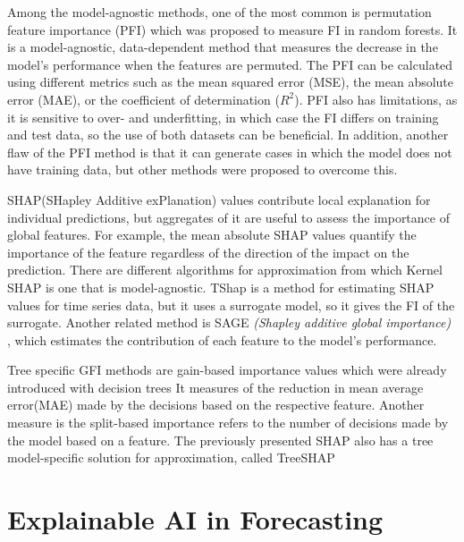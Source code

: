 Among the model-agnostic methods, one of the most common is permutation feature importance (PFI) which was proposed to measure FI in random forests\cite{Breiman2001}.
It is a model-agnostic, data-dependent method that measures the decrease in the model's performance when the features are permuted.
The PFI can be calculated using different metrics such as the mean squared error (MSE), the mean absolute error (MAE), or the coefficient of determination ($R^2$).
PFI also has limitations, as it is sensitive to over- and underfitting\cite{molnar2020limitations}, in which case the FI differs on training and test data, so the use of both datasets can be beneficial.
In addition, another flaw of the PFI method is that it can generate cases in which the model does not have training data\cite{Molnar_2020_pitfalls,giles_hooker_unrestricted_2021},
but other methods were proposed to overcome this\cite{ian_covert_understanding_2020, kristin_blesch_conditional_2023}.

SHAP(SHapley Additive exPlanation)\cite{scott_lundberg_unified_2017} values contribute local explanation for individual predictions, but aggregates of it are useful to assess the importance of global features.
For example, the mean absolute SHAP values quantify the importance of the feature regardless of the direction of the impact on the prediction.
There are different algorithms for approximation from which Kernel SHAP\cite{scott_lundberg_unified_2017} is one that is model-agnostic.
TShap \cite{vikas_c_raykar_tsshap_2023} is a method for estimating SHAP values for time series data, but it uses a surrogate model, so it gives the FI of the surrogate.
Another related method is SAGE \emph{(Shapley additive global importance)} \cite{ian_covert_understanding_2020}, which estimates the contribution of each feature to the model's performance.

Tree specific GFI methods are gain-based importance values which were already introduced with decision trees \cite{gordon_classification_1984}
It measures of the reduction in mean average error(MAE) made by the decisions based on the respective feature.
Another measure is the split-based importance\cite{tianqi_chen_xgboost_2016} refers to the number of decisions made by the model based on a feature.
The previously presented SHAP also has a tree model-specific solution for approximation, called TreeSHAP \cite{scott_lundberg_local_2020}



\section{Explainable AI in Forecasting}
\label{sec:explainable_ai_in_forecasting}

